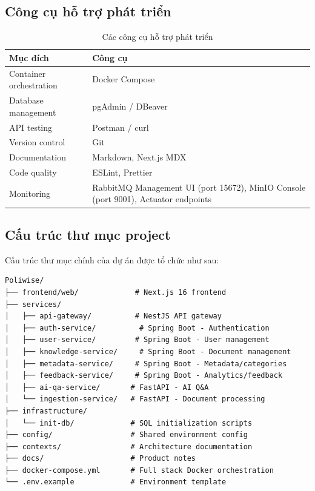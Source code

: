 \documentclass[12pt,a4paper]{report}
\begin{document}
\subsection{Công cụ hỗ trợ phát triển}
\begin{table}[H]
\centering
\caption{Các công cụ hỗ trợ phát triển}
\label{tab:dev_tools}
\begin{tabularx}{\textwidth}{|l|X|}
\hline
\rowcolor{gray!10}
Mục đích & Công cụ \\ \hline
Container orchestration & Docker Compose \\ \hline
Database management & pgAdmin / DBeaver \\ \hline
API testing & Postman / curl \\ \hline
Version control & Git \\ \hline
Documentation & Markdown, Next.js MDX \\ \hline
Code quality & ESLint, Prettier \\ \hline
Monitoring & RabbitMQ Management UI (port 15672), MinIO Console (port 9001), Actuator endpoints \\ \hline
\end{tabularx}
\end{table}

\subsection{Cấu trúc thư mục project}
Cấu trúc thư mục chính của dự án được tổ chức như sau:
\begin{verbatim}
Poliwise/
├── frontend/web/             # Next.js 16 frontend
├── services/
│   ├── api-gateway/          # NestJS API gateway
│   ├── auth-service/          # Spring Boot - Authentication
│   ├── user-service/         # Spring Boot - User management
│   ├── knowledge-service/     # Spring Boot - Document management
│   ├── metadata-service/     # Spring Boot - Metadata/categories
│   ├── feedback-service/     # Spring Boot - Analytics/feedback
│   ├── ai-qa-service/       # FastAPI - AI Q&A
│   └── ingestion-service/   # FastAPI - Document processing
├── infrastructure/
│   └── init-db/             # SQL initialization scripts
├── config/                  # Shared environment config
├── contexts/                # Architecture documentation
├── docs/                    # Product notes
├── docker-compose.yml       # Full stack Docker orchestration
└── .env.example             # Environment template
\end{verbatim}
\end{document}
